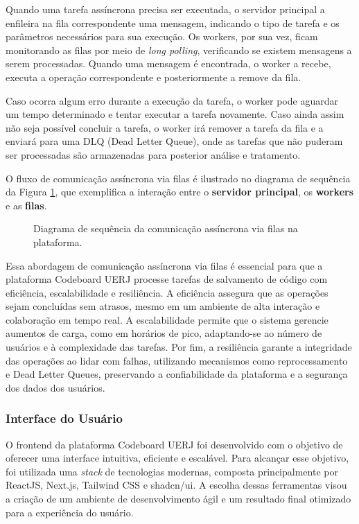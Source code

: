 Quando uma tarefa assíncrona precisa ser executada, o servidor principal a enfileira na fila correspondente uma mensagem, indicando o tipo de tarefa e os parâmetros necessários para sua execução. Os workers, por sua vez, ficam monitorando as filas por meio de \emph{long polling}, verificando se existem mensagens a serem processadas. Quando uma mensagem é encontrada, o worker a recebe, executa a operação correspondente e posteriormente a remove da fila.

Caso ocorra algum erro durante a execução da tarefa, o worker pode aguardar um tempo determinado e tentar executar a tarefa novamente. Caso ainda assim não seja possível concluir a tarefa, o worker irá remover a tarefa da fila e a enviará para uma DLQ (Dead Letter Queue), onde as tarefas que não puderam ser processadas são armazenadas para posterior análise e tratamento.

O fluxo de comunicação assíncrona via filas é ilustrado no diagrama de sequência da Figura \ref{fig:queue-flow}, que exemplifica a interação entre o \textbf{servidor principal}, os \textbf{workers} e as \textbf{filas}.

\begin{figure}[H] 
    \centering
    \caption{Diagrama de sequência da comunicação assíncrona via filas na plataforma.}
    \label{fig:queue-flow}
\end{figure}

Essa abordagem de comunicação assíncrona via filas é essencial para que a plataforma Codeboard UERJ processe tarefas de salvamento de código com eficiência, escalabilidade e resiliência. A eficiência assegura que as operações sejam concluídas sem atrasos, mesmo em um ambiente de alta interação e colaboração em tempo real. A escalabilidade permite que o sistema gerencie aumentos de carga, como em horários de pico, adaptando-se ao número de usuários e à complexidade das tarefas. Por fim, a resiliência garante a integridade das operações ao lidar com falhas, utilizando mecanismos como reprocessamento e Dead Letter Queues, preservando a confiabilidade da plataforma e a segurança dos dados dos usuários.


\subsubsection{Interface do Usuário}

O frontend da plataforma Codeboard UERJ foi desenvolvido com o objetivo de oferecer uma interface intuitiva, eficiente e escalável. Para alcançar esse objetivo, foi utilizada uma \emph{stack} de tecnologias modernas, composta principalmente por ReactJS, Next.js, Tailwind CSS e shadcn/ui. A escolha dessas ferramentas visou a criação de um ambiente de desenvolvimento ágil e um resultado final otimizado para a experiência do usuário.


